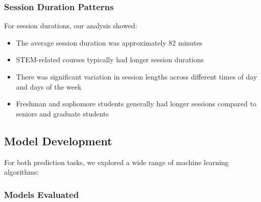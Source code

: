 \documentclass[12pt,letterpaper]{article}
\begin{document}
\subsubsection{Session Duration Patterns}

For session durations, our analysis showed:
\begin{itemize}
    \item The average session duration was approximately 82 minutes
    \item STEM-related courses typically had longer session durations
    \item There was significant variation in session lengths across different times of day and days of the week
    \item Freshman and sophomore students generally had longer sessions compared to seniors and graduate students
\end{itemize}

\subsection{Model Development}

For both prediction tasks, we explored a wide range of machine learning algorithms:

\subsubsection{Models Evaluated}
\end{document}
